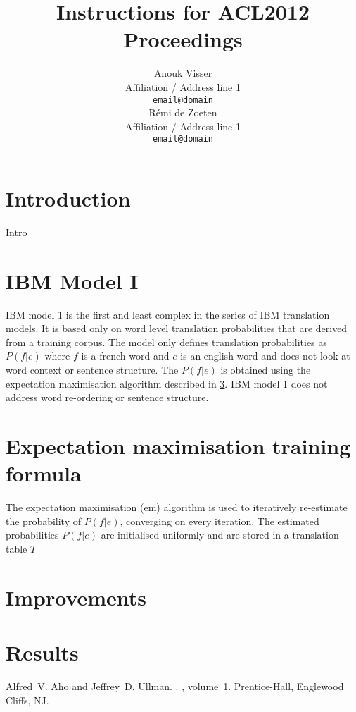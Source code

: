 \documentclass[11pt]{article}
\title{Instructions for ACL2012 Proceedings}
\author{Anouk Visser \\
  Affiliation / Address line 1 \\
  {\tt email@domain} \\\And
  R\'emi de Zoeten \\
  Affiliation / Address line 1 \\
  {\tt email@domain} \\}
\date{}
\begin{document}
\maketitle

\section{Introduction}
Intro


\section{IBM Model I}
IBM model 1 is the first and least complex in the series of IBM translation models. It is based only on word level translation probabilities that are derived from a training corpus. The model only defines translation probabilities as $P(f|e)$ where $f$ is a french word and $e$ is an english word and does not look at word context or sentence structure. The $P(f|e)$ is obtained using the expectation maximisation algorithm described in \ref{em}. IBM model 1 does not address word re-ordering or sentence structure.

\section{Expectation maximisation training formula}
\label{em}
The expectation maximisation (em) algorithm is used to iteratively re-estimate the probability of $P(f|e)$, converging on every iteration. The estimated probabilities $P(f|e)$ are initialised uniformly and are stored in a translation table $T$

\section{Improvements}

\section{Results}




\begin{thebibliography}{}

Alfred~V. Aho and Jeffrey~D. Ullman.
.
, volume~1.
\newblock Prentice-{Hall}, Englewood Cliffs, NJ.


\end{thebibliography}
\end{document}
